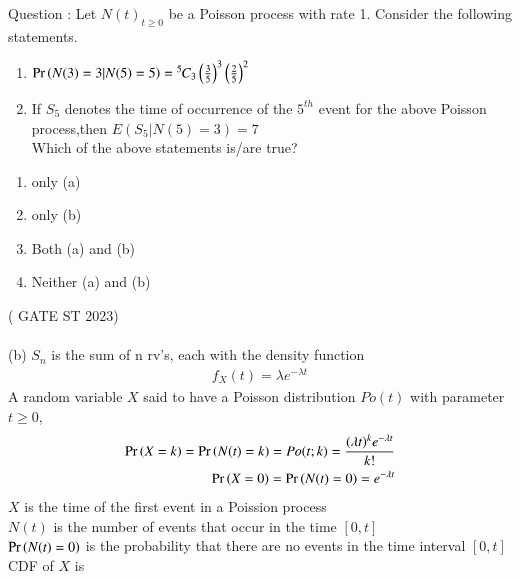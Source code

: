 \documentclass[journal,12pt,onecolumn]{IEEEtran}
\theoremstyle{remark}
\begin{document}
\let\vec\mathbf




\vspace{3cm}



\bigskip

\renewcommand{\thefigure}{\theenumi}
\renewcommand{\thetable}{\theenumi}
Question : Let ${N(t)}_{t\ge 0}$ be a Poisson process with rate 1. Consider the following statements. 
\begin{enumerate}[label=(\alph*)]
\item $\Pr\left(N(3)=3|N(5)=5\right)={{}^{5}\mkern-1muC_{3}}\left(\frac{3}{5}\right)^3 \left(\frac{2}{5}\right)^2$
\item If $S_5$ denotes the time of occurrence of the $5^{th}$ event for the above Poisson process,then $E(S_5|N(5)=3)=7$ \\
Which of the above statements is/are true?\\
\end{enumerate}
\begin{enumerate}[label=(\roman*)]
\item only (a)
\item only (b)
\item Both (a) and (b)
\item Neither (a) and (b)
\end{enumerate}
\hfill ( GATE ST 2023)\\
\solution \\
(b) $S_n$ is the sum of n rv's, each with the density function\\
\begin{align}
f_X(t)=\lambda e^{-\lambda t}
\end{align}
A random variable $X$ said to have a Poisson distribution $Po(t)$ with parameter $t\geq 0$,\\
 \begin{align}
\Pr\left(X=k\right)=\Pr\left(N(t)=k\right)= Po(t;k)=\frac{(\lambda t)^k e^{-\lambda t}}{k!}    \\
\Pr\left(X=0\right)= \Pr\left(N(t)=0\right) =e^{-\lambda t}
\end{align}
$X$ is the time of the first event in a Poission process\\
$N(t)$ is the number of events that occur in the time $[0,t]$\\
$\Pr\left(N(t)=0\right)$ is the probability that there are no events in the time interval $[0,t]$\\
CDF of $X$ is \\
\end{document}
